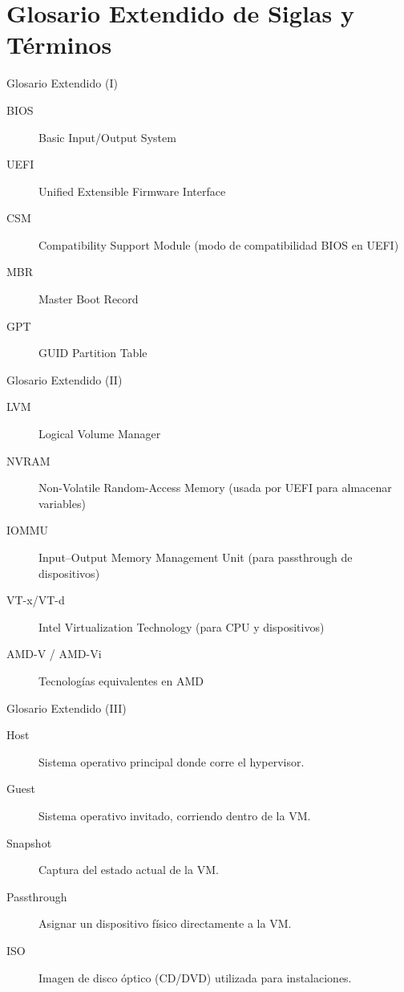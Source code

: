 \documentclass{beamer}
\begin{document}
\section{Glosario Extendido de Siglas y Términos}

\begin{frame}{Glosario Extendido (I)}
    \begin{description}
        \item[BIOS] Basic Input/Output System
        \item[UEFI] Unified Extensible Firmware Interface
        \item[CSM] Compatibility Support Module (modo de compatibilidad BIOS en UEFI)
        \item[MBR] Master Boot Record
        \item[GPT] GUID Partition Table
    \end{description}
\end{frame}

\begin{frame}{Glosario Extendido (II)}
    \begin{description}
        \item[LVM] Logical Volume Manager
        \item[NVRAM] Non-Volatile Random-Access Memory (usada por UEFI para almacenar variables)
        \item[IOMMU] Input–Output Memory Management Unit (para passthrough de dispositivos)
        \item[VT-x/VT-d] Intel Virtualization Technology (para CPU y dispositivos)
        \item[AMD-V / AMD-Vi] Tecnologías equivalentes en AMD
    \end{description}
\end{frame}

\begin{frame}{Glosario Extendido (III)}
    \begin{description}
        \item[Host] Sistema operativo principal donde corre el hypervisor.
        \item[Guest] Sistema operativo invitado, corriendo dentro de la VM.
        \item[Snapshot] Captura del estado actual de la VM.
        \item[Passthrough] Asignar un dispositivo físico directamente a la VM.
        \item[ISO] Imagen de disco óptico (CD/DVD) utilizada para instalaciones.
    \end{description}
\end{frame}
\end{document}
